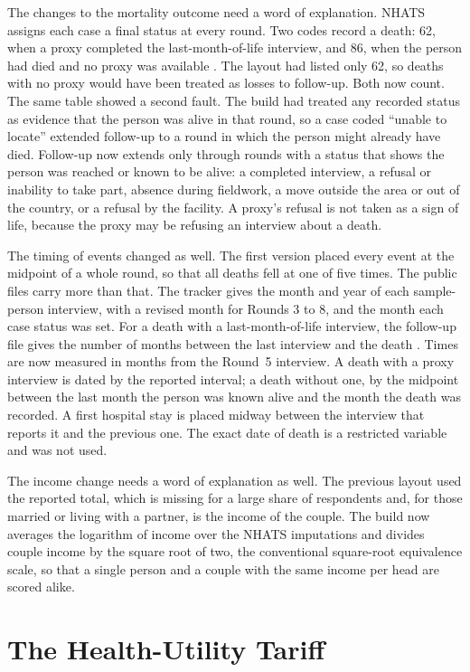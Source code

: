 The changes to the mortality outcome need a word of explanation. NHATS
assigns each case a final status at every round. Two codes record a death:
62, when a proxy completed the last-month-of-life interview, and 86, when
the person had died and no proxy was available \citep{nhats_dcp_r5_2015}.
The layout had listed only 62, so deaths with no proxy would have been
treated as losses to follow-up. Both now count. The same table showed a
second fault. The build had treated any recorded status as evidence that the
person was alive in that round, so a case coded ``unable to locate'' extended
follow-up to a round in which the person might already have died. Follow-up
now extends only through rounds with a status that shows the person was
reached or known to be alive: a completed interview, a refusal or inability
to take part, absence during fieldwork, a move outside the area or out of the
country, or a refusal by the facility. A proxy's refusal is not taken as a
sign of life, because the proxy may be refusing an interview about a death.

The timing of events changed as well. The first version placed every event at
the midpoint of a whole round, so that all deaths fell at one of five times.
The public files carry more than that. The tracker gives the month and year of
each sample-person interview, with a revised month for Rounds 3 to 8, and the
month each case status was set. For a death with a last-month-of-life
interview, the follow-up file gives the number of months between the last
interview and the death \citep{freedman_nhats_userguide_2026}. Times are now
measured in months from the Round~5 interview. A death with a proxy interview
is dated by the reported interval; a death without one, by the midpoint
between the last month the person was known alive and the month the death was
recorded. A first hospital stay is placed midway between the interview that
reports it and the previous one. The exact date of death is a restricted
variable and was not used.

The income change needs a word of explanation as well. The previous layout used the
reported total, which is missing for a large share of respondents and, for
those married or living with a partner, is the income of the couple. The build
now averages the logarithm of income over the NHATS imputations and divides
couple income by the square root of two, the conventional square-root
equivalence scale, so that a single person and a couple with the same income
per head are scored alike.

\section{The Health-Utility Tariff}
\label{sec:G_tariff}

